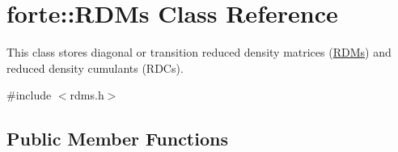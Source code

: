\hypertarget{classforte_1_1_r_d_ms}{}\section{forte\+:\+:R\+D\+Ms Class Reference}
\label{classforte_1_1_r_d_ms}


This class stores diagonal or transition reduced density matrices (\mbox{\hyperlink{classforte_1_1_r_d_ms}{R\+D\+Ms}}) and reduced density cumulants (R\+D\+Cs).  




{\ttfamily \#include $<$rdms.\+h$>$}

\subsection*{Public Member Functions}
